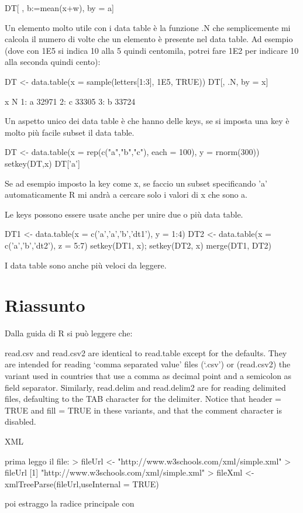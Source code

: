 DT[ , b:=mean(x+w), by = a]

Un elemento molto utile con i data table è la funzione .N che semplicemente mi calcola
il numero di volte che un elemento è presente nel data table.
Ad esempio (dove con 1E5 si indica 10 alla 5 quindi centomila, potrei fare 1E2 per indicare 10 alla seconda quindi cento):

DT <- data.table(x = sample(letters[1:3], 1E5, TRUE))
DT[, .N, by = x]


   x     N
1: a 32971
2: c 33305
3: b 33724

Un aspetto unico dei data table è che hanno delle keys, se si imposta una key è molto più facile subset il data table.

DT <- data.table(x = rep(c("a","b","c"), each = 100), y = rnorm(300))
setkey(DT,x)
DT['a']

Se ad esempio imposto la key come x, se faccio un subset specificando 'a' automaticamente R mi andrà a cercare solo i valori di x che sono a.

Le keys possono essere usate anche per unire due o più data table.

DT1 <- data.table(x = c('a','a','b','dt1'), y = 1:4)
DT2 <- data.table(x = c('a','b','dt2'), z = 5:7)
setkey(DT1, x); setkey(DT2, x)
merge(DT1, DT2)


I data table sono anche più veloci da leggere.



\section{Riassunto}

Dalla guida di R si può leggere che:

read.csv and read.csv2 are identical to read.table except for the defaults. They are intended for reading ‘comma separated value’ files (‘.csv’) or (read.csv2) the variant used in countries that use a comma as decimal point and a semicolon as field separator. Similarly, read.delim and read.delim2 are for reading delimited files, defaulting to the TAB character for the delimiter. Notice that header = TRUE and fill = TRUE in these variants, and that the comment character is disabled.


XML

prima leggo il file:
> fileUrl <- "http://www.w3schools.com/xml/simple.xml"
> fileUrl
[1] "http://www.w3schools.com/xml/simple.xml"
> fileXml <- xmlTreeParse(fileUrl,useInternal = TRUE)

poi estraggo la radice principale con

